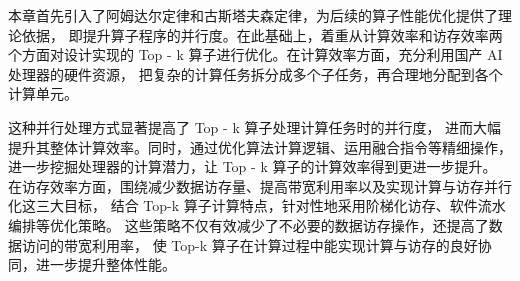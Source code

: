本章首先引入了阿姆达尔定律和古斯塔夫森定律，为后续的算子性能优化提供了理论依据，
即提升算子程序的并行度。在此基础上，着重从计算效率和访存效率两个方面对设计实现的 
Top - k 算子进行优化。在计算效率方面，充分利用国产 AI 处理器的硬件资源，
把复杂的计算任务拆分成多个子任务，再合理地分配到各个计算单元。

这种并行处理方式显著提高了 Top - k 算子处理计算任务时的并行度，
进而大幅提升其整体计算效率。同时，通过优化算法计算逻辑、运用融合指令等精细操作，
进一步挖掘处理器的计算潜力，让 Top - k 算子的计算效率得到更进一步提升。
在访存效率方面，围绕减少数据访存量、提高带宽利用率以及实现计算与访存并行化这三大目标，
结合 Top-k 算子计算特点，针对性地采用阶梯化访存、软件流水编排等优化策略。
这些策略不仅有效减少了不必要的数据访存操作，还提高了数据访问的带宽利用率，
使 Top-k 算子在计算过程中能实现计算与访存的良好协同，进一步提升整体性能。









